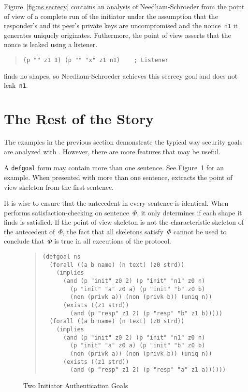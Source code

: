 Figure~\ref{fig:ns secrecy} contains an analysis of Needham-Schroeder
from the point of view of a complete run of the initiator under the
assumption that the responder's and its peer's private keys are
uncompromised and the nonce~\texttt{n1} it generates uniquely
originates.  Futhermore, the point of view asserts that the nonce is
leaked using a listener.
\begin{quote}
\begin{verbatim}
(p "" z1 1) (p "" "x" z1 n1)    ; Listener
\end{verbatim}
\end{quote}

{\cpsa} finds no shapes, so Needham-Schroeder achieves this secrecy
goal and does not leak~\texttt{n1}.

\section{The Rest of the Story}\label{sec:whole story}

The examples in the previous section demonstrate the typical way
security goals are analyzed with {\cpsa}.  However, there are more
features that may be useful.

A \texttt{defgoal} form may contain more than one sentence.  See
Figure~\ref{fig:ns init goals} for an example.  When presented with
more than one sentence, {\cpsa} extracts the point of view skeleton
from the first sentence.

It is wise to ensure that the antecedent in every sentence is
identical.  When {\cpsa} performs satisfaction-checking on
sentence~$\Phi$, it only determines if each shape it finds is
satisfied.  If the point of view skeleton is not the characteristic
skeleton of the antecedent of~$\Phi$, the fact that all skeletons
satisfy~$\Phi$ cannot be used to conclude that~$\Phi$ is true in all
executions of the protocol.

\begin{figure}
\begin{quote}\small
\begin{verbatim}
(defgoal ns
  (forall ((a b name) (n text) (z0 strd))
    (implies
      (and (p "init" z0 2) (p "init" "n1" z0 n)
        (p "init" "a" z0 a) (p "init" "b" z0 b)
        (non (privk a)) (non (privk b)) (uniq n))
      (exists ((z1 strd))
        (and (p "resp" z1 2) (p "resp" "b" z1 b)))))
  (forall ((a b name) (n text) (z0 strd))
    (implies
      (and (p "init" z0 2) (p "init" "n1" z0 n)
        (p "init" "a" z0 a) (p "init" "b" z0 b)
        (non (privk a)) (non (privk b)) (uniq n))
      (exists ((z1 strd))
        (and (p "resp" z1 2) (p "resp" "a" z1 a))))))
\end{verbatim}
\end{quote}
\caption{Two Initiator Authentication Goals}\label{fig:ns init goals}
\end{figure}

